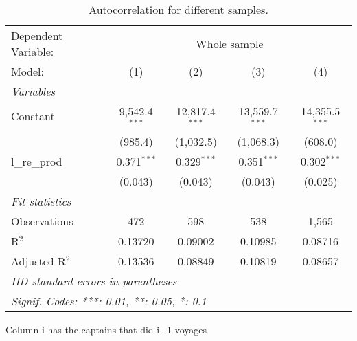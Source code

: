 
\begin{table}[htbp]
   \caption{\label{tab:n_voyage} Autocorrelation for different samples. }
   \centering
   \begin{tabular}{lcccc}
      \tabularnewline \midrule \midrule
      Dependent Variable: & \multicolumn{4}{c}{Whole sample }\\
      Model:         & (1)             & (2)              & (3)              & (4)\\  
      \midrule
      \emph{Variables}\\
      Constant       & 9,542.4$^{***}$ & 12,817.4$^{***}$ & 13,559.7$^{***}$ & 14,355.5$^{***}$\\   
                     & (985.4)         & (1,032.5)        & (1,068.3)        & (608.0)\\   
      l\_re\_prod    & 0.371$^{***}$   & 0.329$^{***}$    & 0.351$^{***}$    & 0.302$^{***}$\\   
                     & (0.043)         & (0.043)          & (0.043)          & (0.025)\\   
      \midrule
      \emph{Fit statistics}\\
      Observations   & 472             & 598              & 538              & 1,565\\  
      R$^2$          & 0.13720         & 0.09002          & 0.10985          & 0.08716\\  
      Adjusted R$^2$ & 0.13536         & 0.08849          & 0.10819          & 0.08657\\  
      \midrule \midrule
      \multicolumn{5}{l}{\emph{IID standard-errors in parentheses}}\\
      \multicolumn{5}{l}{\emph{Signif. Codes: ***: 0.01, **: 0.05, *: 0.1}}\\
   \end{tabular}
   
   \par \raggedright 
   Column i has the captains that did i+1 voyages
\end{table}


